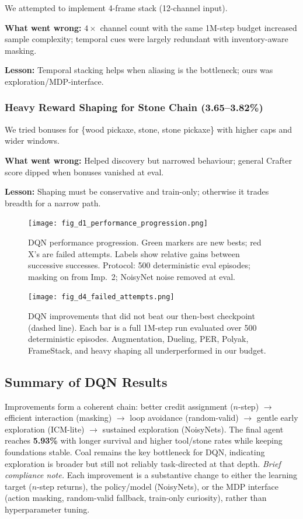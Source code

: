 \documentclass[conference]{IEEEtran}
\begin{document}
We attempted to implement 4-frame stack (12-channel input).

\textbf{What went wrong:} $4\times$ channel count with the same 1M-step budget increased sample complexity; temporal cues were largely redundant with inventory-aware masking.

\textbf{Lesson:} Temporal stacking helps when aliasing is the bottleneck; ours was exploration/MDP-interface.

\subsubsection{Heavy Reward Shaping for Stone Chain (3.65--3.82\%)}

We tried bonuses for \{wood pickaxe, stone, stone pickaxe\} with higher caps and wider windows.

\textbf{What went wrong:} Helped discovery but narrowed behaviour; general Crafter score dipped when bonuses vanished at eval.

\textbf{Lesson:} Shaping must be conservative and train-only; otherwise it trades breadth for a narrow path.

\begin{figure}[h!]
\centering
\texttt{[image: fig\_d1\_performance\_progression.png]}
\caption{DQN performance progression. Green markers are new bests; red X’s are failed attempts. Labels show relative gains between successive successes. Protocol: 500 deterministic eval episodes; masking on from Imp.~2; NoisyNet noise removed at eval.}
\label{fig:dqn_progression}
\end{figure}

\begin{figure}[h!]
\centering
\texttt{[image: fig\_d4\_failed\_attempts.png]}
\caption{DQN improvements that did not beat our then-best checkpoint (dashed line). Each bar is a full 1M-step run evaluated over 500 deterministic episodes. Augmentation, Dueling, PER, Polyak, FrameStack, and heavy shaping all underperformed in our budget.}
\label{fig:dqn_failed}
\end{figure}


\subsection{Summary of DQN Results}
Improvements form a coherent chain: better credit assignment ($n$-step) $\rightarrow$ efficient interaction (masking) $\rightarrow$ loop avoidance (random-valid) $\rightarrow$ gentle early exploration (ICM-lite) $\rightarrow$ sustained exploration (NoisyNets). The final agent reaches \textbf{5.93\%} with longer survival and higher tool/stone rates while keeping foundations stable. Coal remains the key bottleneck for DQN, indicating exploration is broader but still not reliably task-directed at that depth. \smallskip
\noindent\textit{Brief compliance note.} Each improvement is a substantive change to either the learning target (\mbox{$n$-step} returns), the policy/model (NoisyNets), or the MDP interface (action masking, random-valid fallback, train-only curiosity), rather than hyperparameter tuning.
\end{document}
